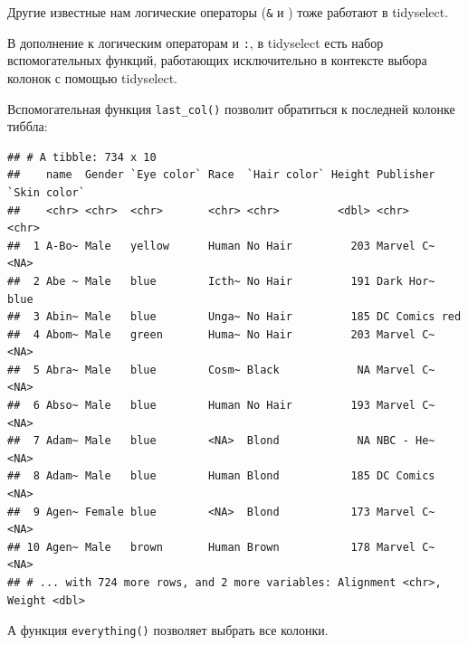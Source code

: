 \documentclass[
]{book}
\newenvironment{Shaded}{\begin{snugshade}}{\end{snugshade}}
\newcommand{\KeywordTok}[1]{\textcolor[rgb]{0.13,0.29,0.53}{\textbf{#1}}}
\newcommand{\NormalTok}[1]{#1}
\newcommand{\OperatorTok}[1]{\textcolor[rgb]{0.81,0.36,0.00}{\textbf{#1}}}
\newcommand{\StringTok}[1]{\textcolor[rgb]{0.31,0.60,0.02}{#1}}
\begin{document}
Другие известные нам логические операторы (\texttt{\&} и \texttt{\textbar{}}) тоже работают в tidyselect.

В дополнение к логическим операторам и \texttt{:}, в tidyselect есть набор вспомогательных функций, работающих исключительно в контексте выбора колонок с помощью tidyselect.

Вспомогательная функция \texttt{last\_col()} позволит обратиться к последней колонке тиббла:

\begin{Shaded}
\end{Shaded}

\begin{verbatim}
## # A tibble: 734 x 10
##    name  Gender `Eye color` Race  `Hair color` Height Publisher `Skin color`
##    <chr> <chr>  <chr>       <chr> <chr>         <dbl> <chr>     <chr>       
##  1 A-Bo~ Male   yellow      Human No Hair         203 Marvel C~ <NA>        
##  2 Abe ~ Male   blue        Icth~ No Hair         191 Dark Hor~ blue        
##  3 Abin~ Male   blue        Unga~ No Hair         185 DC Comics red         
##  4 Abom~ Male   green       Huma~ No Hair         203 Marvel C~ <NA>        
##  5 Abra~ Male   blue        Cosm~ Black            NA Marvel C~ <NA>        
##  6 Abso~ Male   blue        Human No Hair         193 Marvel C~ <NA>        
##  7 Adam~ Male   blue        <NA>  Blond            NA NBC - He~ <NA>        
##  8 Adam~ Male   blue        Human Blond           185 DC Comics <NA>        
##  9 Agen~ Female blue        <NA>  Blond           173 Marvel C~ <NA>        
## 10 Agen~ Male   brown       Human Brown           178 Marvel C~ <NA>        
## # ... with 724 more rows, and 2 more variables: Alignment <chr>, Weight <dbl>
\end{verbatim}

А функция \texttt{everything()} позволяет выбрать все колонки.

\begin{Shaded}
\end{Shaded}
\end{document}
